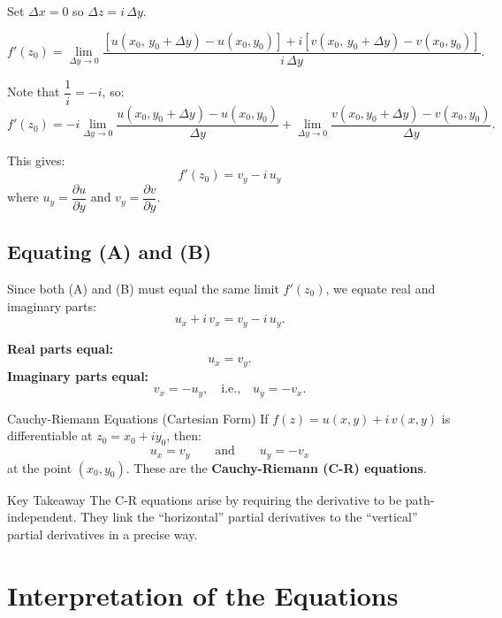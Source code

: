 \documentclass[12pt,a4paper]{article}
\begin{document}
Set $\Delta x = 0$ so $\Delta z = i\,\Delta y$.

\[
  f'(z_0) = \lim_{\Delta y \to 0}
  \frac{[u(x_0,\,y_0+\Delta y) - u(x_0,y_0)] + i[v(x_0,\,y_0+\Delta y) - v(x_0,y_0)]}{i\,\Delta y}.
\]

Note that $\dfrac{1}{i} = -i$, so:
\[
  f'(z_0) = -i\lim_{\Delta y \to 0} \frac{u(x_0,y_0+\Delta y)-u(x_0,y_0)}{\Delta y}
           + \lim_{\Delta y \to 0} \frac{v(x_0,y_0+\Delta y)-v(x_0,y_0)}{\Delta y}.
\]

This gives:
\[
  \boxed{f'(z_0) = v_y - i\,u_y} \tag{B}
\]
where $u_y = \dfrac{\partial u}{\partial y}$ and $v_y = \dfrac{\partial v}{\partial y}$.

\subsection*{Equating (A) and (B)}

Since both (A) and (B) must equal the same limit $f'(z_0)$, we equate real and imaginary parts:
\[
  u_x + i\,v_x = v_y - i\,u_y.
\]

\textbf{Real parts equal:}
\[
  u_x = v_y.
\]
\textbf{Imaginary parts equal:}
\[
  v_x = -u_y, \quad \text{i.e.,} \quad u_y = -v_x.
\]

\begin{infobox}{Cauchy-Riemann Equations (Cartesian Form)}
If $f(z) = u(x,y) + i\,v(x,y)$ is differentiable at $z_0 = x_0+iy_0$, then:
\[
  \boxed{u_x = v_y} \qquad \text{and} \qquad \boxed{u_y = -v_x}
\]
at the point $(x_0, y_0)$.  These are the \textbf{Cauchy-Riemann (C-R) equations}.
\end{infobox}

\begin{learnbox}{Key Takeaway}
The C-R equations arise by requiring the derivative to be path-independent. They link the ``horizontal'' partial derivatives to the ``vertical'' partial derivatives in a precise way.
\end{learnbox}

\section{Interpretation of the Equations}
\end{document}
